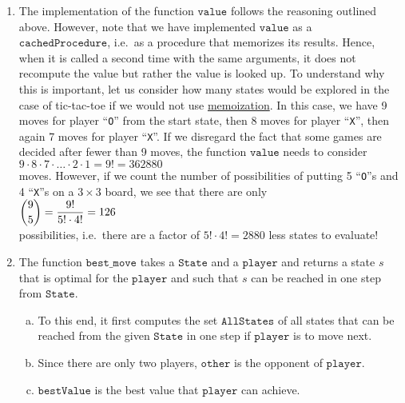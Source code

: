 \begin{enumerate}
\item The implementation of the function $\mathtt{value}$ follows the reasoning outlined above.
      However, note that we have implemented $\mathtt{value}$ as a $\mathtt{cachedProcedure}$, i.e.~as a
      procedure that memorizes its results.  Hence, when it is called a second time with the same arguments, it
      does not recompute the value but rather the value is looked up.  To understand why this is important,
      let us consider how many states would be explored in the case of tic-tac-toe if we would not use
      \href{https://en.wikipedia.org/wiki/Memoization}{memoization}.  In this case, we have 9 moves for player
      ``\texttt{O}'' from the start state, then 8 moves for player ``\texttt{X}'', then again 7 moves for
      player ``\texttt{X}''.  If we disregard the fact that some games are decided after fewer than 9 moves,
      the function $\mathtt{value}$ needs to consider 
      \\[0.2cm]
      \hspace*{1.3cm}
      $9 \cdot 8 \cdot 7 \cdot {\dots} \cdot 2 \cdot 1 = 9! = 362880$
      \\[0.2cm]
      moves.  However, if we count the number of possibilities of putting 5 ``\texttt{O}''s and 4
      ``\texttt{X}''s on a $3 \times 3$ board, we see that there are only
      \\[0.2cm]
      \hspace*{1.3cm}
      $\displaystyle {9 \choose 5} = \frac{9!}{5! \cdot 4!} = 126$
      \\[0.2cm]
      possibilities, i.e.~there are a factor of $5! \cdot 4! = 2880$ less states to evaluate!
\item The function $\mathtt{best\_move}$ takes a $\mathtt{State}$ and a $\mathtt{player}$ and returns a state $s$
      that is optimal for the $\mathtt{player}$ and such that $s$ can be reached in one step from
      $\mathtt{State}$.  
      \begin{enumerate}[(a)]
      \item To this end, it first computes the set $\mathtt{AllStates}$ of all states that can be reached 
            from the given $\mathtt{State}$ in one step if $\mathtt{player}$ is to move next.
      \item Since there are only two players, $\mathtt{other}$ is the opponent of $\mathtt{player}$.
      \item $\mathtt{bestValue}$ is the best value that $\mathtt{player}$ can achieve.

\end{enumerate}
\end{enumerate}
